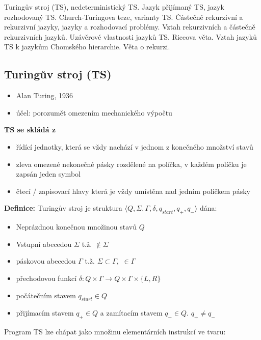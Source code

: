 \documentclass[10pt,a4paper]{article}
\theoremstyle{note}
\begin{document}
Turingův stroj (TS), nedeterministický TS. Jazyk přijímaný TS, jazyk rozhodovaný TS. Church-Turingova
teze, varianty TS. Částečně rekurzivní a rekurzivní jazyky, jazyky a rozhodovací problémy. Vztah rekurzivních
a částečně rekurzivních jazyků. Uzávěrové vlastnosti jazyků TS. Riceova věta. Vztah jazyků TS k jazykům
Chomského hierarchie. Věta o rekurzi.

	\subsection{Turingův stroj (TS)}

		\begin{itemize}
			\item Alan Turing, 1936
			\item účel: porozumět omezením mechanického výpočtu
		\end{itemize}
		\textbf{TS se skládá z}
		\begin{itemize}
			\item řídící jednotky, která se vždy nachází v jednom z konečného množství stavů
			\item zleva omezené nekonečné pásky rozdělené na políčka, v každém políčku je zapsán jeden symbol
			\item čtecí / zapisovací hlavy která je vždy umístěna nad jedním políčkem pásky
		\end{itemize}
		\textbf{Definice: }
		Turingův stroj je struktura $\langle Q, \Sigma, \Gamma, \delta, q_{start}, q_{+}, q_{-} \rangle $ dána:
		\begin{itemize}
			\item Neprázdnou konečnou množinou stavů $Q$
			\item Vstupní abecedou  $\Sigma$ t.ž. \textvisiblespace $ \notin \Sigma$
			\item páskovou abecedou $\Gamma$ t.ž. $\Sigma \subset \Gamma,$ \textvisiblespace $\in  \Gamma $
			\item přechodovou funkcí $\delta : Q \times  \Gamma \rightarrow Q \times \Gamma \times \{L , R \} $
			\item počátečním stavem $q_{start} \in Q$
			\item přijímacím stavem $q_{+} \in Q $ a zamítacím stavem $q_{-} \in Q.$ $q_{+} \neq q_{-}$
		\end{itemize}
		Program TS lze chápat jako množinu elementárních instrukcí ve tvaru:

		\textit{}
\end{document}
